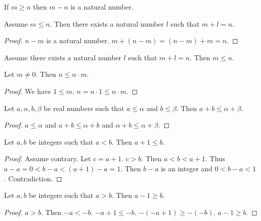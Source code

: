 \documentclass{article}
\begin{document}
\begin{forthel}
\begin{lemma}
If $m \geq n$ then $m-n$ is a natural number.
\end{lemma}

\begin{lemma}
Assume $m \leq n$. Then
there exists a natural number $l$ such that $m + l = n$.
\end{lemma}
\begin{proof}
$n - m$ is a natural number. $m + (n-m) = (n - m) + m = n$.
\end{proof}

\begin{lemma}
Assume there exists a natural number $l$ such 
that $m + l = n$. Then $m \leq n$.
\end{lemma}

\begin{lemma}
Let $m \neq 0$. Then $n \leq n \cdot m$.
\end{lemma}
\begin{proof}
We have $1 \leq m$. $n = n \cdot 1 \leq n \cdot m$.
\end{proof}

\begin{lemma}
Let $a,\alpha,b,\beta$ be real numbers such that $a \leq \alpha$ and $b \leq \beta$.
Then $a + b \leq \alpha + \beta$.
\end{lemma}
\begin{proof}
$a \leq \alpha$ and $a + b \leq \alpha + b$ and $\alpha + b \leq \alpha + \beta$.
\end{proof}

\begin{lemma}
Let $a,b$ be integers such that $a < b$.
Then $a + 1 \leq b$.
\end{lemma}
\begin{proof}
Assume contrary. Let $c = a+1$. $c>b$.
Then $a < b < a + 1$. Thus $a - a = 0 < b - a < (a + 1) - a = 1$. Then $b - a$ is an integer
and $0 < b - a < 1$. Contradiction.
\end{proof}

\begin{lemma}
Let $a,b$ be integers such that $a > b$.
Then $a - 1 \geq b$.
\end{lemma}
\begin{proof}
$a > b$. Then $-a < -b$. $-a + 1 \leq -b$. $-(-a + 1) \geq -(-b)$. $a - 1 \geq b$.
\end{proof}
\end{forthel}
\end{document}
